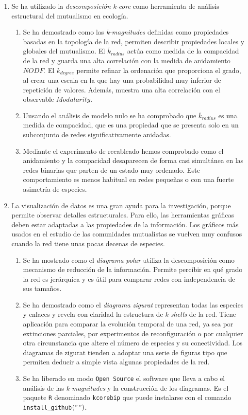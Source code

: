 \begin{enumerate}
\item Se ha utilizado la \textit{descomposición k-core} como herramienta de análisis estructural del mutualismo en ecología. 
	\begin{enumerate}
	\item Se ha demostrado como las \textit{k-magnitudes} definidas como propiedades basadas en la topología de la red, permiten describir propiedades locales y globales del mutualismo. El $\overline {k}_{radius}$ actúa como medida de la compacidad de la red y guarda una alta correlación con la medida de anidamiento $NODF$. El ${k}_{degree}$ permite refinar la ordenación que proporciona el grado, al crear una escala en la que hay una probabilidad muy inferior de repetición de valores. Además, muestra una alta correlación con el observable $Modularity$.
	\item Uusando el análisis de modelo nulo se ha comprobado que $\overline {k}_{radius}$ es una medida de compacidad, que es una propiedad que se presenta solo en un subconjunto de redes significativamente anidadas.
	\item Mediante el experimento de recableado hemos comprobado como el anidamiento y la compacidad desaparecen de forma casi simultánea en las redes binarias que parten de un estado muy ordenado. Este comportamiento es menos habitual en redes pequeñas o con una fuerte asimetría de especies.
	\end{enumerate}

\item La visualización de datos es una gran ayuda para la investigación, porque permite observar detalles estructurales. Para ello, las herramientas gráficas deben estar adaptadas a las propiedades de la información. Los gráficos más usados en el estudio de las comunidades mutualistas se vuelven muy confusos cuando la red tiene unas pocas decenas de especies. 
	\begin{enumerate}
	\item Se ha mostrado como el \textit{diagrama polar} utiliza la descomposición como mecanismo de reducción de la información. Permite percibir en qué grado la red es jerárquica y es útil para comparar redes con independencia de sus tamaños.
	\item Se ha demostrado como el \textit{diagrama zigurat} representan todas las especies y enlaces y revela con claridad la estructura de \textit{k-shells} de la red. Tiene aplicación para comparar la evolución temporal de una red, ya sea por extinciones parciales, por experimentos de reconfiguración o por cualquier otra circunstancia que altere el número de especies y su conectividad. Los diagramas de zigurat tienden a adoptar una serie de figuras tipo que permiten deducir a simple vista algunas propiedades de la red.
	\item Se ha liberado en modo \texttt{Open Source} el software que lleva a cabo el análisis de las \textit{k-magnitudes} y la construcción de los diagramas. Es el paquete \texttt{R} denominado \texttt{kcorebip} que puede instalarse con el comando \texttt{install\_github}$("$$")$.
	\end{enumerate}


\end{enumerate}
